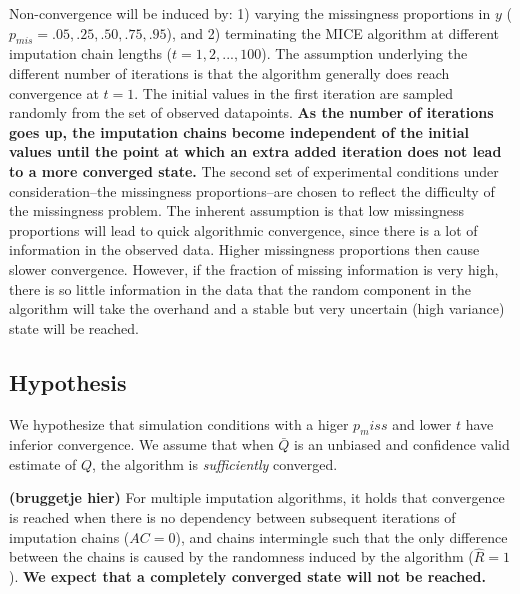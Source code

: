 \documentclass[Royal,times,sageh]{sagej}
\begin{document}
Non-convergence will be induced by: 1) varying the missingness
proportions in \(y\) (\(p_{mis} =.05,.25,.50,.75,.95\)), and 2)
terminating the MICE algorithm at different imputation chain lengths
(\(t = 1, 2,..., 100\)). The assumption underlying the different number
of iterations is that the algorithm generally does reach convergence at
\(t=1\). The initial values in the first iteration are sampled randomly
from the set of observed datapoints. \textbf{As the number of iterations
goes up, the imputation chains become independent of the initial values
until the point at which an extra added iteration does not lead to a
more converged state.} The second set of experimental conditions under
consideration--the missingness proportions--are chosen to reflect the
difficulty of the missingness problem. The inherent assumption is that
low missingness proportions will lead to quick algorithmic convergence,
since there is a lot of information in the observed data. Higher
missingness proportions then cause slower convergence. However, if the
fraction of missing information is very high, there is so little
information in the data that the random component in the algorithm will
take the overhand and a stable but very uncertain (high variance) state
will be reached.

\hypertarget{hypothesis}{%
\subsection{Hypothesis}\label{hypothesis}}

We hypothesize that simulation conditions with a higer \(p_miss\) and
lower \(t\) have inferior convergence. We assume that when \(\bar{Q}\)
is an unbiased and confidence valid estimate of \(Q\), the algorithm is
\emph{sufficiently} converged.

\textbf{(bruggetje hier)} For multiple imputation algorithms, it holds
that convergence is reached when there is no dependency between
subsequent iterations of imputation chains (\(AC = 0\)), and chains
intermingle such that the only difference between the chains is caused
by the randomness induced by the algorithm (\(\widehat{R} = 1\)).
\textbf{We expect that a completely converged state will not be
reached.}
\end{document}

